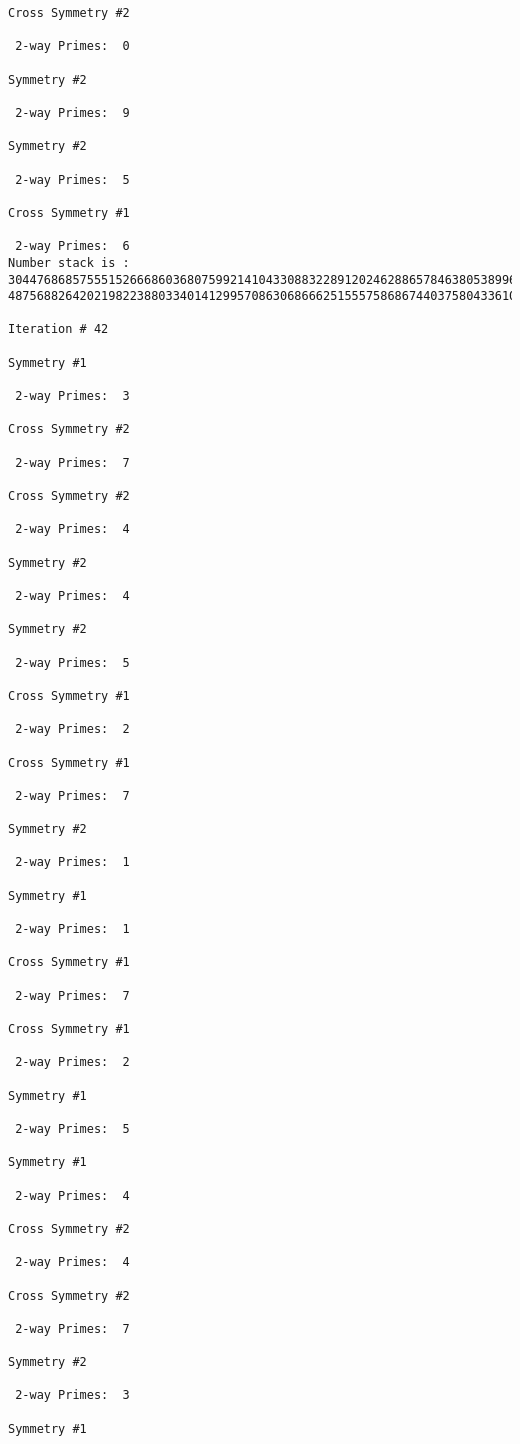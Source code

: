 \begin{verbatim}
Cross Symmetry #2

 2-way Primes: 	0

Symmetry #2

 2-way Primes: 	9

Symmetry #2

 2-way Primes: 	5

Cross Symmetry #1

 2-way Primes: 	6
Number stack is :
30447686857555152666860368075992141043308832289120246288657846380538996794608835958544046240163340857
48756882642021982238803340141299570863068666251555758686744037580433610426404458595388064976998350836

Iteration #	42

Symmetry #1

 2-way Primes: 	3

Cross Symmetry #2

 2-way Primes: 	7

Cross Symmetry #2

 2-way Primes: 	4

Symmetry #2

 2-way Primes: 	4

Symmetry #2

 2-way Primes: 	5

Cross Symmetry #1

 2-way Primes: 	2

Cross Symmetry #1

 2-way Primes: 	7

Symmetry #2

 2-way Primes: 	1

Symmetry #1

 2-way Primes: 	1

Cross Symmetry #1

 2-way Primes: 	7

Cross Symmetry #1

 2-way Primes: 	2

Symmetry #1

 2-way Primes: 	5

Symmetry #1

 2-way Primes: 	4

Cross Symmetry #2

 2-way Primes: 	4

Cross Symmetry #2

 2-way Primes: 	7

Symmetry #2

 2-way Primes: 	3

Symmetry #1


\end{verbatim}
